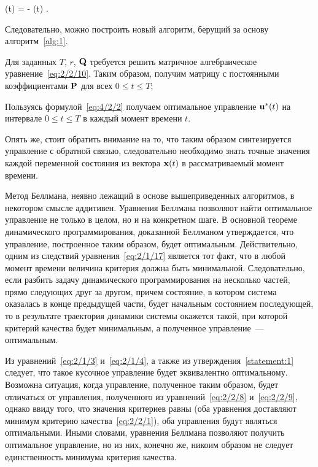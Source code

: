 	\optU(t) = -  (t) \mbox{.}
\eeq

Следовательно, можно построить новый алгоритм, берущий за основу алгоритм~\ref{alg:1}.

	\benum
		\item
			Для заданных $T$, $r$, $\mathbf{Q}$ требуется решить матричное алгебраическое уравнение~\ref{eq:2/2/10}. Таким образом, получим матрицу с постоянными коэффициентами $\mathbf{P}$ для всех $0 \leqslant t \leqslant T$;
			
		\item
			Пользуясь формулой~\ref{eq:4/2/2} получаем оптимальное управление $\mathbf{u}^{*}(t)$ на интервале $0 \leqslant t \leqslant T$ в каждый момент времени $t$.
	\eenum
\ealgo

Опять же, стоит обратить внимание на то, что таким образом синтезируется управление с обратной связью, следовательно необходимо знать точные значения каждой переменной состояния из вектора $\mathbf{x}(t)$ в рассматриваемый момент времени.

\br

Метод Беллмана, неявно лежащий в основе вышеприведенных алгоритмов, в некотором смысле аддитивен. Уравнения Беллмана позволяют найти оптимальное управление не только в целом, но и на конкретном шаге. В основной теореме динамического программирования, доказанной Беллманом утверждается, что управление, построенное таким образом, будет оптимальным. Действительно, одним из следствий уравнения~\vref{eq:2/1/17} является тот факт, что в любой момент времени величина критерия должна быть минимальной. Следовательно, если разбить задачу динамического программирования на несколько частей, прямо следующих друг за другом, причем состояние, в котором система оказалась в конце предыдущей части, будет начальным состоянием последующей, то в результате траектория динамики системы окажется такой, при которой критерий качества будет минимальным, а полученное управление~--- оптимальным.

Из уравнений~\ref{eq:2/1/3} и~\ref{eq:2/1/4}, а также из утверждения~\vref{statement:1} следует, что такое кусочное управление будет эквивалентно оптимальному. Возможна ситуация, когда управление, полученное таким образом, будет отличаться от управления, полученного из уравнений~\ref{eq:2/2/8} и~\vref{eq:2/2/9}, однако ввиду того, что значения критериев равны (оба уравнения доставляют минимум критерию качества~\vref{eq:2/2/1}), оба управления будут являться оптимальными. Иными словами, уравнения Беллмана позволяют получить оптимальное управление, но из них, конечно же, никоим образом не следует единственность минимума критерия качества.


